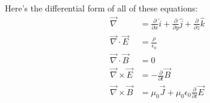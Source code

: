     Here's the differential form of all of these equations:
    \begin{align*}
        \vec{\nabla}&=\frac{\partial}{\partial x}\hat{i}+\frac{\partial}{\partial y}\hat{j}+\frac{\partial}{\partial z}\hat{k}\\
        \vec{\nabla}\cdot\vec{E}&=\frac{\rho}{\epsilon_0}\\
        \vec{\nabla}\cdot\vec{B}&=0\\
        \vec{\nabla}\times\vec{E}&=-\frac{\partial}{\partial t}\vec{B}\\
        \vec{\nabla}\times\vec{B}&=\mu_0\vec{J}+\mu_0\epsilon_0\frac{\partial}{\partial t}\vec{E}\\
    \end{align*}
\newpage